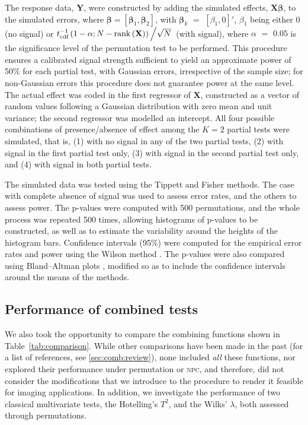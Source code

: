 The response data, $\mathbf{Y}$, were constructed by adding the simulated effects, $\mathbf{X}\boldsymbol{\beta}$, to the simulated errors, where $\boldsymbol{\beta} = \left[\boldsymbol{\beta}_1,\boldsymbol{\beta}_2\right]$, with $\boldsymbol{\beta}_k$ $=$ $[\beta_1, 0]'$, $\beta_1$ being either 0 (no signal) or $t^{-1}_{\text{cdf}}\left(1-\alpha ; N-\mathrm{rank}\left(\mathbf{X}\right)\right)\left/\sqrt{N}\right.$ (with signal), where $\alpha$ $=$ $0.05$ is the significance level of the permutation test to be performed. This procedure ensures a calibrated signal strength sufficient to yield an approximate power of 50\% for each partial test, with Gaussian errors, irrespective of the sample size; for non-Gaussian errors this procedure does not guarantee power at the same level. The actual effect was coded in the first regressor of $\mathbf{X}$, constructed as a vector of random values following a Gaussian distribution with zero mean and unit variance; the second regressor was modelled an intercept. All four possible combinations of presence/absence of effect among the $K=2$ partial tests were simulated, that is, (1) with no signal in any of the two partial tests, (2) with signal in the first partial test only, (3) with signal in the second partial test only, and (4) with signal in both partial tests.

The simulated data was tested using the Tippett and Fisher methods. The case with complete absence of signal was used to assess error rates, and the others to assess power. The p-values were computed with 500 permutations, and the whole process was repeated 500 times, allowing histograms of p-values to be constructed, as well as to estimate the variability around the heights of the histogram bars. Confidence intervals (95\%) were computed for the empirical error rates and power using the Wilson method \citep{Wilson1927}. The p-values were also compared using Bland--Altman plots \citep{Bland1986}, modified so as to include the confidence intervals around the means of the methods.

\subsection{Performance of combined tests}

We also took the opportunity to compare the combining functions shown in Table~\ref{tab:comparison}. While other comparisons have been made in the past (for a list of references, see \ref{sec:comb:review}), none included \emph{all} these functions, nor explored their performance under permutation or \textsc{npc}, and therefore, did not consider the modifications that we introduce to the procedure to render it feasible for imaging applications. In addition, we investigate the performance of two classical multivariate tests, the Hotelling's $T^2$, and the Wilks' $\lambda$, both assessed through permutations.

